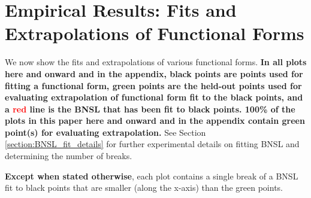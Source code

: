 \documentclass{article} %
\begin{document}




%
\section{Empirical Results: Fits and Extrapolations of Functional Forms}
\vspace{-3.85mm}
\label{section:functional_form_fits}

We now show the fits and extrapolations of various functional forms. \textbf{In all plots here and onward and in the appendix, black points are points used for fitting a functional form, \textcolor{Green3}{green} points are the held-out points used for evaluating extrapolation of functional form fit to the black points, and a \textcolor{red}{red} line is the BNSL that has been fit to black points. 100\% of the plots in this paper here and onward and in the appendix contain \textcolor{Green3}{green} point(s) for evaluating extrapolation.} See Section \ref{section:BNSL_fit_details} for further experimental details on fitting BNSL and determining the number of breaks.

\vspace{-1.6mm}

\textbf{Except when stated otherwise}, each plot contains a single break of a BNSL fit to black points that are smaller (along the x-axis) than the green points.

\vspace{-1.6mm}

\end{document}
